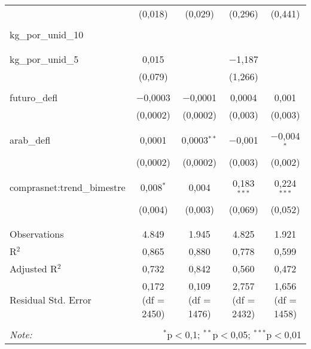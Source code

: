 \begin{table}[!htbp]
\begin{tabular}{@{\extracolsep{5pt}}lcccc}
  & (0,018) & (0,029) & (0,296) & (0,441) \\ 
  & & & & \\ 
 kg\_por\_unid\_10 &  &  &  &  \\ 
  &  &  &  &  \\ 
  & & & & \\ 
 kg\_por\_unid\_5 & 0,015 &  & $-$1,187 &  \\ 
  & (0,079) &  & (1,266) &  \\ 
  & & & & \\ 
 futuro\_defl & $-$0,0003 & $-$0,0001 & 0,0004 & 0,001 \\ 
  & (0,0002) & (0,0002) & (0,003) & (0,003) \\ 
  & & & & \\ 
 arab\_defl & 0,0001 & 0,0003$^{**}$ & $-$0,001 & $-$0,004$^{*}$ \\ 
  & (0,0002) & (0,0002) & (0,003) & (0,002) \\ 
  & & & & \\ 
 comprasnet:trend\_bimestre & 0,008$^{*}$ & 0,004 & 0,183$^{***}$ & 0,224$^{***}$ \\ 
  & (0,004) & (0,003) & (0,069) & (0,052) \\ 
  & & & & \\ 
\hline \\[-1.8ex] 
Observations & 4.849 & 1.945 & 4.825 & 1.921 \\ 
R$^{2}$ & 0,865 & 0,880 & 0,778 & 0,599 \\ 
Adjusted R$^{2}$ & 0,732 & 0,842 & 0,560 & 0,472 \\ 
Residual Std. Error & 0,172 (df = 2450) & 0,109 (df = 1476) & 2,757 (df = 2432) & 1,656 (df = 1458) \\ 
\hline 
\hline \\[-1.8ex] 
\textit{Note:}  & \multicolumn{4}{r}{$^{*}$p$<$0,1; $^{**}$p$<$0,05; $^{***}$p$<$0,01} \\ 
\end{tabular} 
\end{table} 
